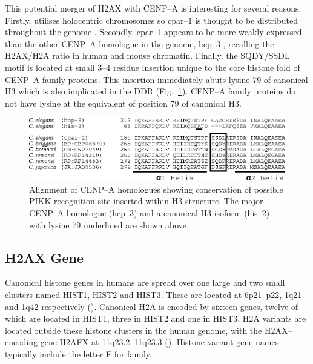 This potential merger of H2AX with \mbox{CENP--A} is interesting for several reasons: Firstly,
 utilises holocentric chromosomes so \mbox{cpar--1} is thought to be distributed
throughout the genome \citep{MMH+05}. Secondly, \mbox{cpar--1} appears to be more weakly expressed
than the other \mbox{CENP--A} homologue in the  genome, \mbox{hcp--3} \citep{MMH+05},
recalling the H2AX/H2A ratio in human and mouse chromatin. Finally, the SQDY/SSDL motif is located
at small 3--4 residue insertion unique to the core histone fold of \mbox{CENP--A} family proteins.
This insertion immediately abuts lysine 79 of canonical H3 which is also implicated in the DDR
(Fig.\ \ref{fig:h2ax-review:celegans})\@. \mbox{CENP--A} family proteins do not have lysine at the equivalent of
position 79 of canonical H3.

\begin{figure}
\centering
\includegraphics{h2ax-review/figs/Fig1}
\caption{Alignment of \protect{} \protect\mbox{CENP--A} homologues showing
conservation of possible PIKK recognition site inserted within H3 structure. The major
\protect{} \protect\mbox{CENP--A} homologue (\protect\mbox{hcp--3}) and a canonical
H3 isoform (\protect\mbox{his--2}) with lysine 79 underlined are shown above.}
\label{fig:h2ax-review:celegans}
\end{figure}

\subsection{H2AX Gene}
Canonical histone genes in humans are spread over one large and two small clusters named HIST1,
HIST2 and HIST3. These are located at 6p21--p22, 1q21 and 1q42 respectively ().
Canonical H2A is encoded by sixteen genes, twelve of which are located in HIST1, three in HIST2 and
one in HIST3. H2A variants are located outside these histone clusters in the human genome, with the
H2AX--encoding gene H2AFX at 11q23.2--11q23.3 \citep{IZP+94} ().
Histone variant gene names typically include the letter F for family.

